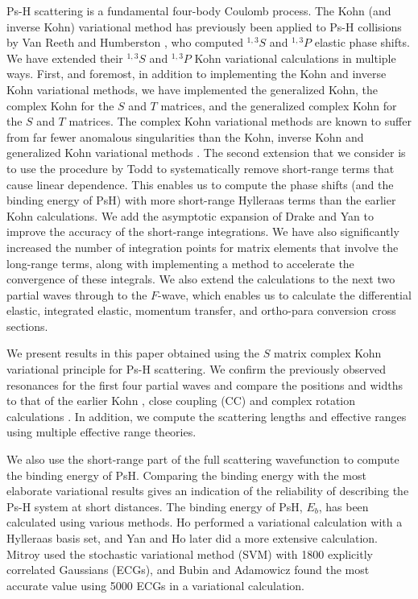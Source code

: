 \documentclass[Dissertation.tex]{subfiles}
\begin{document}
Ps-H scattering is a fundamental four-body Coulomb process. The Kohn (and 
inverse Kohn) variational method has previously been applied to Ps-H 
collisions by Van Reeth and Humberston \cite{VanReeth2003,VanReeth2004}, who 
computed $^{1,3}S$ and $^{1,3}P$ elastic phase shifts. We 
have extended their $^{1,3}S$ and $^{1,3}P$ Kohn variational calculations in 
multiple ways. First, and foremost, in addition to implementing
the Kohn and inverse Kohn variational methods, we have implemented the 
generalized Kohn, the complex Kohn for the $S$ and $T$ matrices, and the
generalized complex Kohn for the $S$ and $T$
matrices. The complex Kohn variational methods are known to suffer
from far fewer anomalous singularities than the Kohn, inverse Kohn and 
generalized Kohn variational methods
\cite{Lucchese1989, Cooper2009, Cooper2010}. The second extension that we
consider is to use the procedure by Todd 
\cite{Todd2007} to systematically remove short-range terms that cause linear 
dependence. This enables us to compute the phase shifts (and the binding 
energy of PsH) with more short-range Hylleraas terms than the earlier 
Kohn calculations. We add the asymptotic expansion of Drake and Yan
\cite{Drake1995, Yan1997} to improve the accuracy of the short-range
integrations. We have also significantly increased the number of integration
points for matrix
elements that involve the long-range terms, along with implementing a method to
accelerate the convergence of these integrals. We also extend the 
calculations to the next two partial waves through to the $F$-wave, which
enables us to calculate the differential elastic, integrated elastic, momentum
transfer, and ortho-para conversion cross sections.

We present results in this paper obtained using the $S$ matrix complex Kohn 
variational principle for Ps-H scattering. We confirm the previously observed 
resonances for the first four partial waves and compare the positions and 
widths to that of the earlier Kohn \cite{VanReeth2003,VanReeth2004}, close 
coupling (CC) \cite{Walters2004} and complex rotation calculations
\cite{Yan1999,Yan1998a,Ho1998,Ho2000}. In addition, we compute the scattering
lengths and effective ranges using multiple effective range theories.

We also use the short-range part of the full scattering wavefunction to 
compute the binding energy of PsH. Comparing the binding energy with the most 
elaborate variational results gives an indication of the reliability of 
describing the Ps-H system at short distances. The binding energy of PsH,
$E_b$, has been calculated using various methods. Ho \cite{Ho1986} performed a 
variational calculation with a Hylleraas basis set, and Yan and Ho
\cite{Yan1999} later did a more extensive calculation. Mitroy \cite{Mitroy2006}
used the stochastic variational method (SVM) with 1800 explicitly correlated 
Gaussians (ECGs), and Bubin and Adamowicz \cite{Bubin2006} found the most 
accurate value using 5000 ECGs in a variational calculation.
\end{document}
